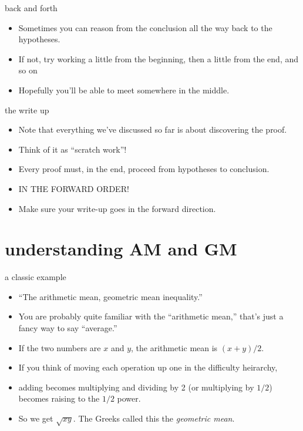 \documentclass[landscape]{beamer}
\begin{document}
\begin{frame}{back and forth}
\begin{itemize}
\item Sometimes you can reason from the conclusion all the way back to the hypotheses. \pause
\item If not, try working a little from the beginning, then a little from the end, and so on\textellipsis \pause
\item Hopefully you'll be able to meet somewhere in the middle. 
\end{itemize}
\end{frame}

\begin{frame}{the write up}
\begin{itemize}
\item Note that everything we've discussed so far is about discovering the proof.\pause
\item Think of it as ``scratch work''! \pause
\item Every proof must, in the end, proceed from hypotheses to conclusion. \pause
\item IN THE FORWARD ORDER! \pause
\item Make sure your write-up goes in the forward direction.
\end{itemize}
\end{frame}

\section{understanding AM and GM}

\begin{frame}{a classic example}
\begin{itemize}
\item ``The arithmetic mean, geometric mean inequality.''\pause
\item You are probably quite familiar with the ``arithmetic mean,'' \pause \newline
that's just a fancy way to say ``average.'' \pause
\item If the two numbers are $x$ and $y$, the arithmetic mean is $(x+y)/2$. \pause
\item If you think of moving each operation up one in the difficulty heirarchy, \pause
\item adding becomes multiplying \pause \newline 
and dividing by 2 (or multiplying by $1/2$) becomes raising to the $1/2$ power. \pause
\item So we get $\sqrt{xy}$. \pause The Greeks called this the {\em geometric mean}.
\end{itemize}
\end{frame}
\end{document}
